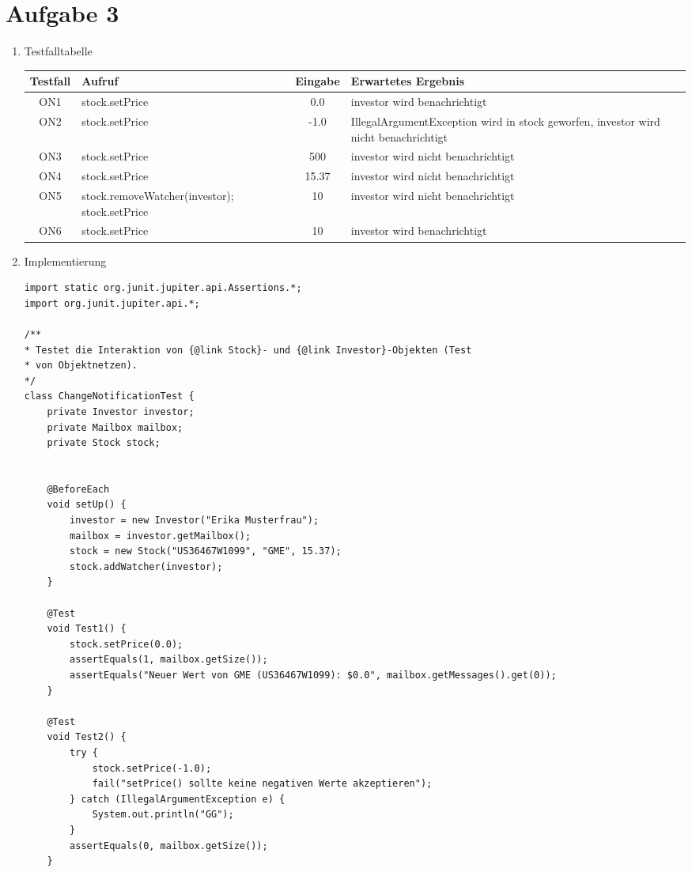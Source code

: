 \documentclass{article}
\begin{document}
	\section*{Aufgabe 3}
	\begin{enumerate}[label=(\alph*)]
		\item Testfalltabelle
		\begin{center}
			\begin{tabular}{c|C{5cm}|c|C{5cm}}
				\textbf{Testfall} & \textbf{Aufruf} & \textbf{Eingabe} & \textbf{Erwartetes Ergebnis} \\
				\hline
				ON1 & stock.setPrice & 0.0 & investor wird benachrichtigt \\
				\hline
				ON2 & stock.setPrice & -1.0 & IllegalArgumentException wird in stock geworfen, investor wird nicht benachrichtigt \\
				\hline
				ON3 & stock.setPrice & 500 & investor wird nicht benachrichtigt \\
				\hline
				ON4 & stock.setPrice & 15.37 & investor wird nicht benachrichtigt \\
				\hline
				ON5 & stock.removeWatcher(investor); stock.setPrice & 10 & investor wird nicht benachrichtigt \\
				\hline
				ON6 & stock.setPrice & 10 & investor wird benachrichtigt
			\end{tabular}
		\end{center}
		\item Implementierung
		\begin{lstlisting}[style=java, tabsize=2]
import static org.junit.jupiter.api.Assertions.*;
import org.junit.jupiter.api.*;

/**
* Testet die Interaktion von {@link Stock}- und {@link Investor}-Objekten (Test
* von Objektnetzen).
*/
class ChangeNotificationTest {
	private Investor investor;
	private Mailbox mailbox;
	private Stock stock;


	@BeforeEach
	void setUp() {
		investor = new Investor("Erika Musterfrau");
		mailbox = investor.getMailbox();
		stock = new Stock("US36467W1099", "GME", 15.37);
		stock.addWatcher(investor);
	}

	@Test
	void Test1() {
		stock.setPrice(0.0);
		assertEquals(1, mailbox.getSize());
		assertEquals("Neuer Wert von GME (US36467W1099): $0.0", mailbox.getMessages().get(0));
	}

	@Test
	void Test2() {
		try {
			stock.setPrice(-1.0);
			fail("setPrice() sollte keine negativen Werte akzeptieren");
		} catch (IllegalArgumentException e) {
			System.out.println("GG");
		}
		assertEquals(0, mailbox.getSize());
	}


\end{lstlisting}
\end{enumerate}
\end{document}

